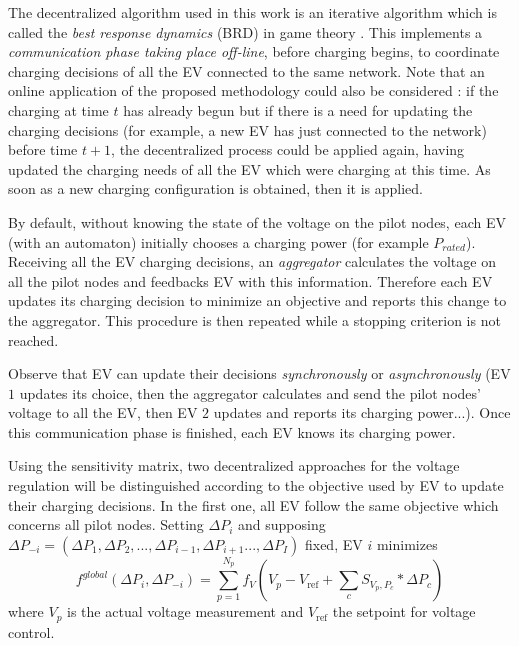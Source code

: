 \documentclass[journal]{IEEEtran}
\begin{document}
The decentralized algorithm used in this work is an iterative algorithm which is called the \textit{best response dynamics} (BRD) in game theory \cite{Fudenberg1991}. This implements a \textit{communication phase taking place off-line}, before charging begins, to coordinate charging decisions of all the EV connected to the same network. Note that an online application of the proposed methodology could also be considered : if the charging at time $t$ has already begun but if there is a need for updating the charging decisions (for example, a new EV has just connected to the network) before time $t+1$, the decentralized process could be applied again, having updated the charging needs of all the EV which were charging at this time. As soon as a new charging configuration is obtained, then it is applied.

By default, without knowing the state of the voltage on the pilot nodes, each EV (with an automaton) initially chooses a charging power (for example $ P_{rated}$). Receiving all the EV charging decisions, an \textit{aggregator} calculates the voltage on all the pilot nodes and feedbacks EV with this information. Therefore each EV updates its charging decision to minimize an objective and reports this change to the aggregator. This procedure is then repeated while a stopping criterion is not reached.

Observe that EV can update their decisions \textit{synchronously} or \textit{asynchronously} (EV $1$ updates its choice, then the aggregator calculates and send the pilot nodes' voltage to all the EV, then EV $2$ updates and reports its charging power...). Once this communication phase is finished, each EV knows its charging power. 

Using the sensitivity matrix, two decentralized approaches for the voltage regulation will be distinguished according to the objective used by EV to update their charging decisions. In the first one, all EV follow the same objective which concerns all pilot nodes. Setting $\Delta P_{i}$ and supposing $\Delta P_{-i}=(\Delta P_{1},\Delta P_{2},...,\Delta P_{i-1},\Delta P_{i+1}...,\Delta P_{I})$ fixed, EV $i$ minimizes
\begin{equation}
f^{global}(\Delta P_{i},\Delta P_{-i})=\displaystyle \sum_{p=1}^{N_{p}} f_V(V_{p}-V_{\textrm{ref}}+\displaystyle \sum_{c}S_{V_{p},P_c} *\Delta P_c)
\end{equation}
where $V_{p}$ is the actual voltage measurement and $V_{\textrm{ref}}$ the setpoint for voltage control. 
\end{document}
